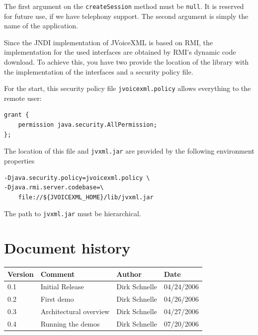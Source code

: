 \documentclass[11pt,a4paper]{article}
\begin{document}
The first argument on the \texttt{createSession} method must be 
\texttt{null}. It is reserved for future use, if we have telephony
support. The second argument is simply the name of the application.

Since the JNDI implementation of JVoiceXML is based on RMI, 
the implementation for the used interfaces are obtained by
RMI's dynamic code download. To achieve this, you have two provide
the location of the library with the implementation of the
interfaces and a security policy file.

For the start, this security policy file \texttt{jvoicexml.policy}
allows everything to the remote user:

\begin{lstlisting}
grant {
    permission java.security.AllPermission;
};
\end{lstlisting}

The location of this file and  \texttt{jvxml.jar} are provided by the following
environment properties

\begin{lstlisting}
-Djava.security.policy=jvoicexml.policy \
-Djava.rmi.server.codebase=\
    file://${JVOICEXML_HOME}/lib/jvxml.jar
\end{lstlisting}

The path to \texttt{jvxml.jar} must be hierarchical.

\section*{Document history}

\begin{tabular}{|l|p{5cm}|l|l|}
\hline
\textbf{Version} & \textbf{Comment} & \textbf{Author} & \textbf{Date} \\
\hline
\hline
0.1 & Initial Release & Dirk Schnelle & 04/24/2006 \\
\hline
0.2 & First demo & Dirk Schnelle & 04/26/2006 \\
\hline
0.3 & Architectural overview & Dirk Schnelle & 04/27/2006 \\
\hline
0.4 & Running the demos & Dirk Schnelle & 07/20/2006 \\
\hline
\end{tabular}




\end{document}
